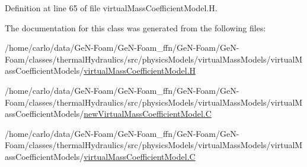 Definition at line 65 of file virtual\+Mass\+Coefficient\+Model.\+H.



The documentation for this class was generated from the following files\+:\begin{DoxyCompactItemize}
\item 
/home/carlo/data/\+Ge\+N-\/\+Foam/\+Ge\+N-\/\+Foam\+\_\+ffn/\+Ge\+N-\/\+Foam/\+Ge\+N-\/\+Foam/classes/thermal\+Hydraulics/src/physics\+Models/virtual\+Mass\+Models/virtual\+Mass\+Coefficient\+Models/\hyperlink{virtualMassCoefficientModel_8H}{virtual\+Mass\+Coefficient\+Model.\+H}\item 
/home/carlo/data/\+Ge\+N-\/\+Foam/\+Ge\+N-\/\+Foam\+\_\+ffn/\+Ge\+N-\/\+Foam/\+Ge\+N-\/\+Foam/classes/thermal\+Hydraulics/src/physics\+Models/virtual\+Mass\+Models/virtual\+Mass\+Coefficient\+Models/\hyperlink{newVirtualMassCoefficientModel_8C}{new\+Virtual\+Mass\+Coefficient\+Model.\+C}\item 
/home/carlo/data/\+Ge\+N-\/\+Foam/\+Ge\+N-\/\+Foam\+\_\+ffn/\+Ge\+N-\/\+Foam/\+Ge\+N-\/\+Foam/classes/thermal\+Hydraulics/src/physics\+Models/virtual\+Mass\+Models/virtual\+Mass\+Coefficient\+Models/\hyperlink{virtualMassCoefficientModel_8C}{virtual\+Mass\+Coefficient\+Model.\+C}\end{DoxyCompactItemize}
